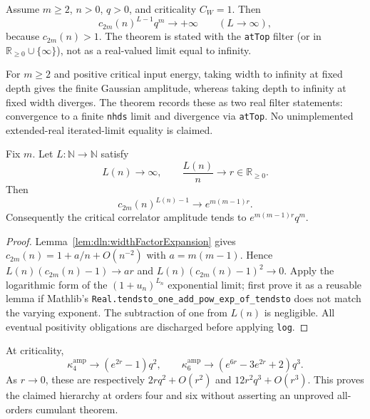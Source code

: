 \begin{theorem}
\label{thm:dln:fixedWidthDivergence}
Assume $m\geq2$, $n>0$, $q>0$, and criticality $C_W=1$.  Then
\[
 c_{2m}(n)^{L-1}q^m\longrightarrow+\infty
 \qquad(L\to\infty),
\]
because $c_{2m}(n)>1$.  The theorem is stated with the \texttt{atTop} filter (or in
$\mathbb R_{\geq0}\cup\{\infty\}$), not as a real-valued limit equal to infinity.
\end{theorem}

\begin{corollary}
\label{cor:dln:noncommuting}
For $m\geq2$ and positive critical input energy, taking width to infinity at fixed depth gives the
finite Gaussian amplitude, whereas taking depth to infinity at fixed width diverges.  The theorem
records these as two real filter statements: convergence to a finite \texttt{nhds} limit and
divergence via \texttt{atTop}.  No unimplemented extended-real iterated-limit equality is claimed.
\end{corollary}

\begin{theorem}
\label{thm:dln:doubleScaling}
Fix $m$.  Let $L:\mathbb N\to\mathbb N$ satisfy
\[
 L(n)\to\infty,\qquad \frac{L(n)}n\to r\in\mathbb R_{\geq0}.
\]
Then
\[
 c_{2m}(n)^{L(n)-1}\longrightarrow e^{m(m-1)r}.
\]
Consequently the critical correlator amplitude tends to
$e^{m(m-1)r}q^m$.

\begin{proof}
Lemma~\ref{lem:dln:widthFactorExpansion} gives
$c_{2m}(n)=1+a/n+O(n^{-2})$ with $a=m(m-1)$.  Hence
$L(n)(c_{2m}(n)-1)\to ar$ and
$L(n)(c_{2m}(n)-1)^2\to0$.  Apply the logarithmic form of the
$(1+u_n)^{L_n}$ exponential limit; first prove it as a reusable lemma if Mathlib's
\texttt{Real.tendsto\_one\_add\_pow\_exp\_of\_tendsto} does not match the varying exponent.  The
subtraction of one from $L(n)$ is negligible.  All eventual positivity obligations are discharged
before applying \texttt{log}.
\end{proof}
\end{theorem}

\begin{corollary}
\label{cor:dln:doubleScaledCumulants}
At criticality,
\[
 \kappa_4^{\mathrm{amp}}\to(e^{2r}-1)q^2,
 \qquad
 \kappa_6^{\mathrm{amp}}\to(e^{6r}-3e^{2r}+2)q^3.
\]
As $r\to0$, these are respectively $2rq^2+O(r^2)$ and
$12r^2q^3+O(r^3)$.  This proves the claimed hierarchy at orders four and six without asserting an
unproved all-orders cumulant theorem.
\end{corollary}

